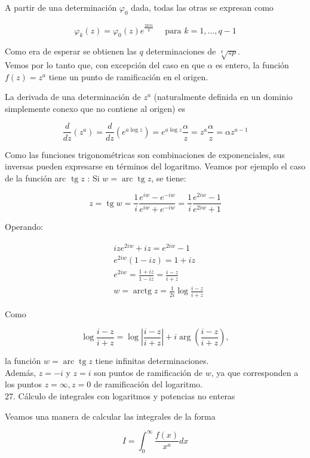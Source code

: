 \documentclass[10pt]{article}
\theoremstyle{plain}
\theoremstyle{definition}
\theoremstyle{remark}
\begin{document}
A partir de una determinación $\varphi_{0}$ dada, todas las otras se expresan como

$$
\varphi_{k}(z)=\varphi_{0}(z) e^{\frac{2 k \pi i}{q}} \quad \text { para } k=1, \ldots, q-1
$$

Como era de esperar se obtienen las $q$ determinaciones de $\sqrt[q]{z p}$.\\
Vemos por lo tanto que, con excepción del caso en que $\alpha$ es entero, la función $f(z)=z^{a}$ tiene un punto de ramificación en el origen.

La derivada de una determinación de $z^{a}$ (naturalmente definida en un dominio simplemente conexo que no contiene al origen) es

$$
\frac{d}{d z}\left(z^{a}\right)=\frac{d}{d z}\left(e^{a \log z}\right)=e^{a \log z} \frac{\alpha}{z}=z^{a} \frac{\alpha}{z}=\alpha z^{a-1}
$$

Como las funciones trigonométricas son combinaciones de exponenciales, sus inversas pueden expresarse en términos del logaritmo. Veamos por ejemplo el caso de la función arc $\operatorname{tg} z$ : Si $w=\operatorname{arc} \operatorname{tg} z$, se tiene:

$$
z=\operatorname{tg} w=\frac{1}{i} \frac{e^{i w}-e^{-i w}}{e^{i w}+e^{-i w}}=\frac{1}{i} \frac{e^{2 i w}-1}{e^{2 i w}+1}
$$

Operando:

$$
\begin{aligned}
& i z e^{2 i w}+i z=e^{2 i w}-1 \\
& e^{2 i w}(1-i z)=1+i z \\
& e^{2 i w}=\frac{1+i z}{1-i z}=\frac{i-z}{i+z} \\
& w=\operatorname{arctg} z=\frac{1}{2 i} \log \frac{i-z}{i+z}
\end{aligned}
$$

Como

$$
\log \frac{i-z}{i+z}=\log \left|\frac{i-z}{i+z}\right|+i \arg \left(\frac{i-z}{i+z}\right),
$$

la función $w=\operatorname{arc} \operatorname{tg} z$ tiene infinitas determinaciones.\\
Además, $z=-i$ y $z=i$ son puntos de ramificación de $w$, ya que corresponden a los puntos $z=\infty, z=0$ de ramificación del logaritmo.\\
27. Cálculo de integrales con logaritmos y potencias no enteras

Veamos una manera de calcular las integrales de la forma

$$
I=\int_{0}^{\infty} \frac{f(x)}{x^{a}} d x
$$
\end{document}
